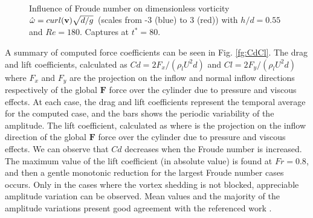 \begin{figure}[htbp]
\begin{center}
{    } \\
 \\
 \\
  \end{center}
  \caption{Influence of Froude number on dimensionless vorticity $\hat\omega = curl(\mathbf{v}) \sqrt{d/g}$ (scales from -3 (blue) to 3 (red)) with $h/d = 0.55$ and $Re=180$. Captures at $t^*=80$.
}
\label{fg:vort_Re180}
\end{figure}


A summary of computed force coefficients can be seen in Fig. \ref{fg:CdCl}. The drag and lift coefficients, calculated as $Cd=2 F_x/(\rho_l U^2 d)$ and $Cl=2 F_y/(\rho_l U^2 d)$ where $F_x$ and $F_y$ are the projection on the inflow and normal inflow directions respectively of the global $\mathbf{F}$ force over the cylinder due to pressure and viscous effects. At each case, the drag and lift coefficients represent the temporal average for the computed case, and the bars shows the periodic variability of the amplitude. The lift coefficient, calculated as where  is the projection on the inflow direction of the global $\mathbf{F}$ force over the cylinder due to pressure and viscous effects. We can observe that $Cd$ decreases when the Froude number is increased. The maximum value of the lift coefficient (in absolute value) is found at $Fr = 0.8$, and then a gentle monotonic reduction for the largest Froude number cases occurs. Only in the cases where the vortex shedding is not blocked, appreciable amplitude variation can be observed. Mean values and the majority of the amplitude variations present good agreement with the referenced work \cite{Bouscasse14}.

